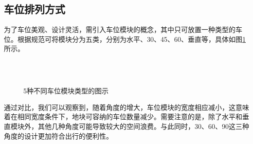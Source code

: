 \subsection{车位排列方式}
为了车位美观、设计灵活，需引入车位模块的概念\cite{1022674189.nh}，其中只可放置一种类型的车位。根据规范\cite{ZGBZ202119043}可将模块分为五类，分别为水平、30\textdegree、45\textdegree、60\textdegree、垂直等，具体如图\ref{fig:parking_module}所示。
\begin{figure}[htbp]
  \centering
  \quad
  \\
  \quad
  \\
  \caption{5种不同车位模块类型的图示}
  \label{fig:parking_module}
\end{figure}
通过对比，我们可以观察到，随着角度的增大，车位模块的宽度相应减小，这意味着在相同宽度条件下，地块可容纳的车位数量减少。需要注意的是，除了水平和垂直模块外，其他几种角度可能导致较大的空间浪费。与此同时，30\textdegree、60\textdegree、90\textdegree 这三种角度的设计更加符合出行的便利性。

